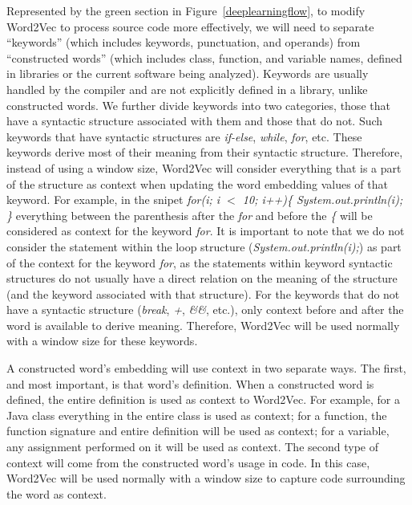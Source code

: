 Represented by the green section in Figure~\ref{deeplearningflow}, to modify Word2Vec to process source code more effectively, we will need to separate ``keywords'' (which includes keywords, punctuation, and operands) from ``constructed words'' (which includes class, function, and variable names, defined in libraries or the current software being analyzed). Keywords are usually handled by the compiler and are not explicitly defined in a library, unlike constructed words. We further divide keywords into two categories, those that have a syntactic structure associated with them and those that do not. Such keywords that have syntactic structures are \textit{if-else}, \textit{while}, \textit{for}, etc. These keywords derive most of their meaning from their syntactic structure. Therefore, instead of using a window size, Word2Vec will consider everything that is a part of the structure as context when updating the word embedding values of that keyword. For example, in the snipet \textit{for(i; i $<$ 10; i++)\{ System.out.println(i); \}} everything between the parenthesis after the \textit{for} and before the \textit{\{} will be considered as context for the keyword \textit{for}. It is important to note that we do not consider the statement within the loop structure (\textit{System.out.println(i);}) as part of the context for the keyword \textit{for}, as the statements within keyword syntactic structures do not usually have a direct relation on the meaning of the structure (and the keyword associated with that structure). For the keywords that do not have a syntactic structure (\textit{break}, \textit{+}, \textit{\&\&}, etc.), only context before and after the word is available to derive meaning. Therefore, Word2Vec will be used normally with a window size for these keywords.

A constructed word's embedding will use context in two separate ways. The first, and most important, is that word's definition. When a constructed word is defined, the entire definition is used as context to Word2Vec. For example, for a Java class everything in the entire class is used as context; for a function, the function signature and entire definition will be used as context; for a variable, any assignment performed on it will be used as context. The second type of context will come from the constructed word's usage in code. In this case, Word2Vec will be used normally with a window size to capture code surrounding the word as context.

